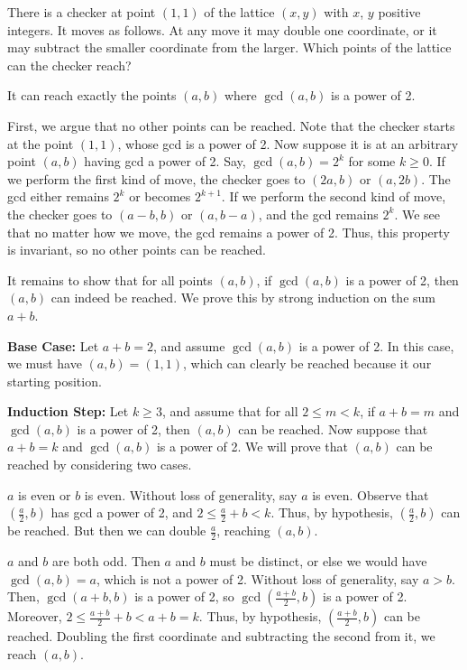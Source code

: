 \begin{problem}
There is a checker at point $(1, 1)$ of the lattice $(x, y)$ with $x$, $y$ positive integers. It moves as follows. At any move it may double one coordinate, or it may subtract the smaller coordinate from the larger. Which points of the lattice can the checker reach?
\end{problem}

It can reach exactly the points $(a, b)$ where $\gcd(a, b)$ is a power of 2.

First, we argue that no other points can be reached. Note that the checker starts at the point $(1, 1)$, whose gcd is a power of 2. Now suppose it is at an arbitrary point $(a, b)$ having gcd a power of 2. Say, $\gcd(a, b) = 2^k$ for some $k \geq 0$. If we perform the first kind of move, the checker goes to $(2a, b)$ or $(a, 2b)$. The gcd either remains $2^k$ or becomes $2^{k+1}$. If we perform the second kind of move, the checker goes to $(a-b, b)$ or $(a, b-a)$, and the gcd remains $2^k$. We see that no matter how we move, the gcd remains a power of 2. Thus, this property is invariant, so no other points can be reached.

It remains to show that for all points $(a, b)$, if $\gcd(a, b)$ is a power of 2, then $(a, b)$ can indeed be reached. We prove this by strong induction on the sum $a + b$.

\textbf{Base Case:} Let $a + b = 2$, and assume $\gcd(a, b)$ is a power of 2. In this case, we must have $(a, b) = (1, 1)$, which can clearly be reached because it our starting position.

\textbf{Induction Step:} Let $k \geq 3$, and assume that for all $2 \leq m < k$, if $a + b = m$ and $\gcd(a, b)$ is a power of 2, then $(a, b)$ can be reached. Now suppose that $a + b = k$ and $\gcd(a, b)$ is a power of 2. We will prove that $(a, b)$ can be reached by considering two cases.

\begin{case}
$a$ is even or $b$ is even. Without loss of generality, say $a$ is even. Observe that $(\frac{a}{2}, b)$ has gcd a power of 2, and $2 \leq \frac{a}{2} + b < k$. Thus, by hypothesis, $(\frac{a}{2}, b)$ can be reached. But then we can double $\frac{a}2$, reaching $(a, b)$.
\end{case}

\begin{case}
$a$ and $b$ are both odd. Then $a$ and $b$ must be distinct, or else we would have $\gcd(a, b) = a$, which is not a power of 2. Without loss of generality, say $a > b$. Then, $\gcd(a + b, b)$ is a power of 2, so $\gcd(\frac{a + b}2, b)$ is a power of 2. Moreover, $2 \leq \frac{a + b}2 + b < a + b = k$. Thus, by hypothesis, $(\frac{a + b}2, b)$ can be reached. Doubling the first coordinate and subtracting the second from it, we reach $(a, b)$.
\end{case}


